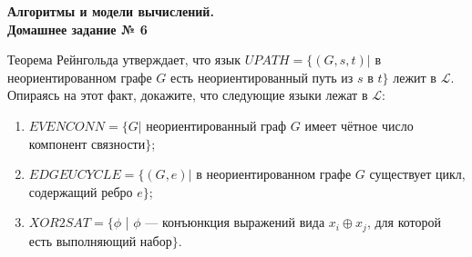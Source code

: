 \documentclass[a4paper,12pt]{article}
\begin{document}
	
	\thispagestyle{firstpage}
	
	\begin{center}
		\textbf{\Large{Алгоритмы и модели вычислений. \\ Домашнее задание № 6}}
	\end{center}
	
\begin{tasknum}{1}
	Теорема Рейнгольда утверждает, что язык $UPATH = \{(G, s, t) |$ в неориентированном графе $G$ есть неориентированный путь из $s$ в $t\}$ лежит в $\mathcal{L}$. Опираясь на этот факт, докажите, что следующие языки лежат в $\mathcal{L}$:
	
	\begin{enumerate}
		\item $EVENCONN = \{G |$ неориентированный граф $G$ имеет чётное число компонент связности$\}$;
		\item $EDGEUCYCLE = \{(G, e) |$ в неориентированном графе $G$ существует цикл, содержащий ребро $e\}$;

		\item $XOR2SAT = \{\phi$ | $\phi$ — конъюнкция выражений вида $x_i \oplus x_j$, для которой есть выполняющий набор$\}$.
	\end{enumerate}
\end{tasknum}
\end{document}
